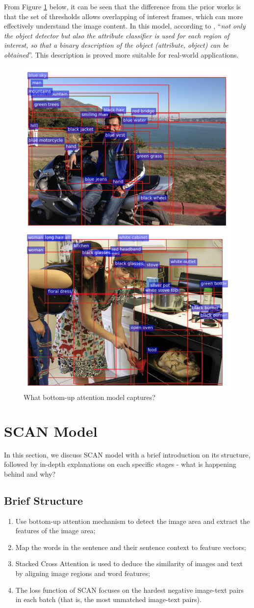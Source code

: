 From Figure \ref{fig:bottomup} below, it can be seen that the difference from the prior works is that the set of thresholds allows overlapping of interest frames, which can more effectively understand the image content. In this model, according to \cite{bottomup}, ``\textit{not only the object detector but also the attribute classifier is used for each region of interest, so that a binary description of the object (attribute, object) can be obtained}''. This description is proved more suitable for real-world applications.

\begin{figure}[h!]
\centering
\includegraphics[width=.55\textwidth]{bottomup.pdf}
\caption{What bottom-up attention model captures? \cite{bottomup}}
\label{fig:bottomup}
\end{figure}

\section{SCAN Model}
In this section, we discuss SCAN model with a brief introduction on its structure, followed by in-depth explanations on each specific stages - what is happening behind and why?

\subsection{Brief Structure}
\begin{enumerate}
    \item Use bottom-up attention mechanism \cite{bottomup} to detect the image area and extract the features of the image area;
    \item Map the words in the sentence and their sentence context to feature vectors;
    \item Stacked Cross Attention is used to deduce the similarity of images and text by aligning image regions and word features;
    \item The loss function of SCAN focuses on the hardest negative image-text pairs in each batch (that is, the most unmatched image-text pairs).
\end{enumerate}

